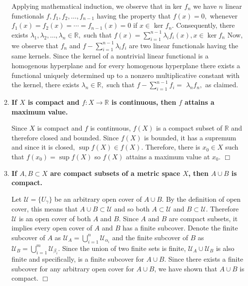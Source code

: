 \documentclass[12pt,letterpaper,reqno]{amsart}
\newcommand{\R}{\mathbb R}
\begin{document}
\begin{enumerate}[1.]
\begin{flushleft}
    Applying mathematical induction, we observe that in ker $f _ { n }$ we have $n$
linear functionals $f , f _ { 1 } , f _ { 2 } , \ldots , f _ { n - 1 }$ having the property that $f ( x ) = 0 ,$ whenever $f _ { 1 } ( x ) = f _ { 2 } ( x ) = \cdots = f _ { n - 1 } ( x ) = 0$ if $x \in$ ker $f _ { n } .$ Consequently, there exists $\lambda _ { 1 } , \lambda _ { 2 } , \ldots , \lambda _ { n } \in \mathbb { R } ,$ such that $f ( x ) = \sum _ { i = 1 } ^ { n - 1 } \lambda _ { i } f _ { i } ( x ) , x \in \operatorname { ker } f _ { n }$
Now, we observe that $f _ { n }$ and $f - \sum _ { i = 1 } ^ { n - 1 } \lambda _ { i } f _ { i }$ are two linear functionals having the same kernels. Since the kernel of a nontrivial linear functional is a homogenous hyperplane and for every homogenous hyperplane there exists a functional uniquely determined up to a nonzero multiplicative constant with the kernel, there exists $\lambda _ { n } \in \mathbb { R } ,$ such that $f - \sum _ { i = 1 } ^ { n - 1 } f _ { i } =$
$\lambda _ { n } f _ { n } ,$ as claimed.
\end{flushleft}
\item \textbf{If $X$ is compact and $f: X\rightarrow \R$ is continuous, then $f$ attains a maximum value.}
\begin{flushleft}
    Since $X$ is compact and $f$ is continuous, $f(X)$ is a compact subset of $\R$ and therefore closed and bounded. Since $f(X)$ is bounded, it has a supremum and since it is closed, $\sup f(X) \in f(X)$. Therefore, there is $x_0 \in X$ such that $f(x_0) = \sup f(X)$ so $f(X)$ attains a maximum value at $x_0$. $\Box$
\end{flushleft}
\item \textbf{If $A, B\subset X$ are compact subsets of a metric space $X$, then $A\cup B$ is compact.}
\begin{flushleft}
    Let $\mathcal{U} = \{U_\gamma\}$ be an arbitrary open cover of $A \cup B$. By the definition of open cover, this means that $A \cup B \subset \mathcal{U}$ and so both $A \subset \mathcal{U}$ and $B \subset \mathcal{U}$. Therefore $\mathcal{U}$ is an open cover of both $A$ and $B$. Since $A$ and $B$ are compact subsets, it implies every open cover of $A$ and $B$ has a finite subcover. Denote the finite subcover of $A$ as $\mathcal{U}_A = \bigcup\limits_{i=1}^n \mathcal{U}_{\alpha_i}$ and the finite subcover of $B$ as $\mathcal{U}_B = \bigcup\limits_{i=1}^m \mathcal{U}_{\beta_i}$. Since the union of two finite sets is finite, $\mathcal{U}_A \cup \mathcal{U}_B$ is also finite and specifically, is a finite subcover for $A \cup B$. Since there exists a finite subcover for any arbitrary open cover for $A \cup B$, we have shown that $A \cup B$ is compact. $\Box$

\end{flushleft}
\end{enumerate}
\end{document}
